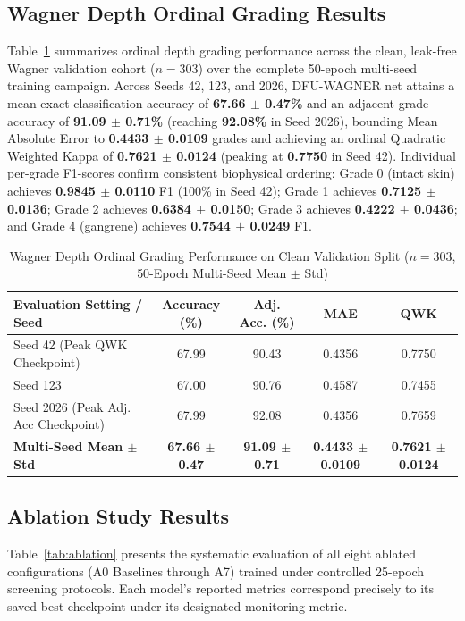\documentclass[journal]{IEEEtran}
\begin{document}
\subsection{Wagner Depth Ordinal Grading Results}
Table~\ref{tab:wagner_results} summarizes ordinal depth grading performance across the clean, leak-free Wagner validation cohort ($n = 303$) over the complete 50-epoch multi-seed training campaign. Across Seeds 42, 123, and 2026, DFU-WAGNER net attains a mean exact classification accuracy of \textbf{67.66 $\pm$ 0.47\%} and an adjacent-grade accuracy of \textbf{91.09 $\pm$ 0.71\%} (reaching \textbf{92.08\%} in Seed 2026), bounding Mean Absolute Error to \textbf{0.4433 $\pm$ 0.0109} grades and achieving an ordinal Quadratic Weighted Kappa of \textbf{0.7621 $\pm$ 0.0124} (peaking at \textbf{0.7750} in Seed 42). Individual per-grade F1-scores confirm consistent biophysical ordering: Grade 0 (intact skin) achieves \textbf{0.9845 $\pm$ 0.0110} F1 (100\% in Seed 42); Grade 1 achieves \textbf{0.7125 $\pm$ 0.0136}; Grade 2 achieves \textbf{0.6384 $\pm$ 0.0150}; Grade 3 achieves \textbf{0.4222 $\pm$ 0.0436}; and Grade 4 (gangrene) achieves \textbf{0.7544 $\pm$ 0.0249} F1.

\begin{table}[h]
\centering
\caption{Wagner Depth Ordinal Grading Performance on Clean Validation Split ($n=303$, 50-Epoch Multi-Seed Mean $\pm$ Std)}
\label{tab:wagner_results}
\begin{tabular}{lcccc}
\toprule
\textbf{Evaluation Setting / Seed} & \textbf{Accuracy (\%)} & \textbf{Adj. Acc. (\%)} & \textbf{MAE} & \textbf{QWK} \\
\midrule
Seed 42 (Peak QWK Checkpoint) & 67.99 & 90.43 & 0.4356 & 0.7750 \\
Seed 123 & 67.00 & 90.76 & 0.4587 & 0.7455 \\
Seed 2026 (Peak Adj. Acc Checkpoint) & 67.99 & 92.08 & 0.4356 & 0.7659 \\
\midrule
\textbf{Multi-Seed Mean $\pm$ Std} & \textbf{67.66 $\pm$ 0.47} & \textbf{91.09 $\pm$ 0.71} & \textbf{0.4433 $\pm$ 0.0109} & \textbf{0.7621 $\pm$ 0.0124} \\
\bottomrule
\end{tabular}
\end{table}

\subsection{Ablation Study Results}
Table~\ref{tab:ablation} presents the systematic evaluation of all eight ablated configurations (A0 Baselines through A7) trained under controlled 25-epoch screening protocols. Each model's reported metrics correspond precisely to its saved best checkpoint under its designated monitoring metric.
\end{document}
